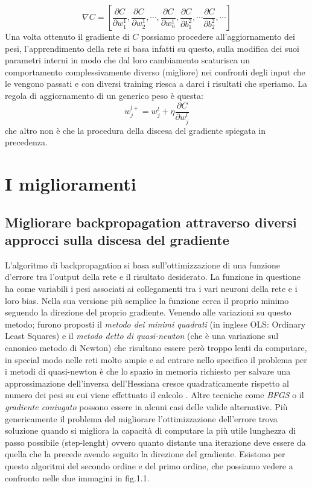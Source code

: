 \begin{equation}
	\nabla C = \left[ \dfrac{\partial C}{\partial w_{1}^{1}}, \dfrac{\partial C}{\partial w_{2}^{1}}, \cdots, \dfrac{\partial C}{\partial w_{n}^{1}},\dfrac{\partial C}{\partial b_{1}^{2}}, \cdots \dfrac{\partial C}{\partial b_{2}^{2}}, \cdots \right] 
\end{equation} 
Una volta ottenuto il gradiente di $C$ possiamo procedere all'aggiornamento dei pesi, l'apprendimento della rete si basa infatti su questo, sulla modifica dei suoi parametri interni in modo che dal loro cambiamento scaturisca un comportamento complessivamente diverso (migliore) nei confronti degli input che le vengono passati e con diversi training riesca a darci i risultati che speriamo.
La regola di aggiornamento di un generico peso è questa:
\begin{equation}
	w_{j}^{l +} = w_{j}^{l} + \eta \dfrac{\partial C}{\partial w_{j}^{l}}
\end{equation}
che altro non è che la procedura della discesa del gradiente spiegata in precedenza.

\section*{I miglioramenti}
\subsection*{Migliorare backpropagation attraverso diversi approcci sulla discesa del gradiente}

L'algoritmo di backpropagation si basa sull'ottimizzazione di una funzione d'errore tra l'output della rete e il risultato desiderato. La funzione in questione ha come variabili i pesi associati ai collegamenti tra i vari neuroni della rete e i loro bias. Nella sua versione più semplice la funzione cerca il proprio minimo seguendo la direzione del proprio gradiente.
Venendo alle variazioni su questo metodo; furono proposti il \textit{metodo dei minimi quadrati} (in inglese OLS: Ordinary Least Squares) e il \textit{metodo detto di quasi-newton} (che è una variazione sul canonico metodo di Newton) che risultano essere però troppo lenti da computare, in special modo nelle reti molto ampie e ad entrare nello specifico il problema per i metodi di quasi-newton è che lo spazio in memoria richiesto per salvare una approssimazione dell'inversa dell'Hessiana cresce quadraticamente rispetto al numero dei pesi su cui viene effettuato il calcolo \cite{saito1997partial}. Altre tecniche come \textit{BFGS} o il \textit{gradiente coniugato} possono essere in alcuni casi delle valide alternative.
Più genericamente il problema del migliorare l'ottimizzazione dell'errore trova soluzione quando si migliora la capacità di computare la più utile lunghezza di passo possibile (step-lenght) ovvero quanto distante una iterazione deve essere da quella che la precede avendo seguito la direzione del gradiente.
Esistono per questo algoritmi del secondo ordine e del primo ordine, che possiamo vedere a confronto nelle due immagini in fig.1.1.


